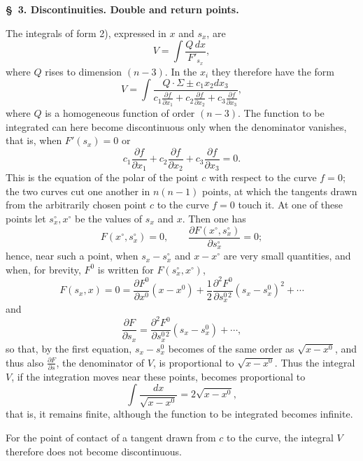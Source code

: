 \documentclass[10pt]{article}
\begin{document}
\begin{center}
{\bfseries \S\ 3. Discontinuities. Double and return points.}
\end{center}

The integrals of form 2), expressed in $x$ and $s_x$, are
\[
V=\int\frac{Q\,dx}{F'_{s_x}},
\]
where $Q$ rises to dimension $(n-3)$. In the $x_i$ they therefore have the form
\[
V=\int\frac{Q\cdot\Sigma\pm c_1x_2dx_3}{c_1\frac{\partial f}{\partial x_1}+c_2\frac{\partial f}{\partial x_2}+c_3\frac{\partial f}{\partial x_3}},
\]
where $Q$ is a homogeneous function of order $(n-3)$. The function to be integrated can here become discontinuous only when the denominator vanishes, that is, when $F'(s_x)=0$ or
\[
c_1\frac{\partial f}{\partial x_1}+c_2\frac{\partial f}{\partial x_2}+c_3\frac{\partial f}{\partial x_3}=0.
\]
This is the equation of the polar of the point $c$ with respect to the curve $f=0$; the two curves cut one another in $n(n-1)$ points, at which the tangents drawn from the arbitrarily chosen point $c$ to the curve $f=0$ touch it. At one of these points let $s_x^\circ,x^\circ$ be the values of $s_x$ and $x$. Then one has
\[
F(x^\circ,s_x^\circ)=0,\qquad \frac{\partial F(x^\circ,s_x^\circ)}{\partial s_x^\circ}=0;
\]
hence, near such a point, when $s_x-s_x^\circ$ and $x-x^\circ$ are very small quantities, and when, for brevity, $F^0$ is written for $F(s_x^\circ,x^\circ)$,
\[
F(s_x,x)=0=\frac{\partial F^0}{\partial x^0}(x-x^0)+\frac12\frac{\partial^2F^0}{\partial s_x^{0\,2}}(s_x-s_x^0)^2+\cdots
\]
and
\[
\frac{\partial F}{\partial s_x}=\frac{\partial^2F^0}{\partial s_x^{0\,2}}(s_x-s_x^0)+\cdots,
\]
so that, by the first equation, $s_x-s_x^0$ becomes of the same order as $\sqrt{x-x^0}$, and thus also $\frac{\partial F}{\partial s}$, the denominator of $V$, is proportional to $\sqrt{x-x^0}$. Thus the integral $V$, if the integration moves near these points, becomes proportional to
\[
\int\frac{dx}{\sqrt{x-x^0}}=2\sqrt{x-x^0},
\]
that is, it remains finite, although the function to be integrated becomes infinite.

For the point of contact of a tangent drawn from $c$ to the curve, the integral $V$ therefore does not become discontinuous.
\end{document}
